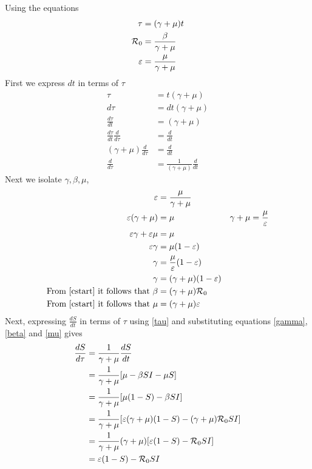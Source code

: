 Using the equations
\begin{subequations}\label{cstart}
\begin{align}
  \tau &= (\gamma+\mu)t\\
  {\mathcal R_0} &= \frac{\beta}{\gamma+\mu}\\
  \varepsilon &= \frac {\mu}{\gamma+\mu}
\end{align}
\end{subequations}
First we express $dt$ in terms of $\tau$
\begin{align}
    \tau &= t(\gamma + \mu)\nonumber\\
    d\tau &= dt(\gamma + \mu)\nonumber\\
    \frac{d\tau}{dt} &= (\gamma + \mu)\nonumber\\
    \frac{d\tau}{dt}\frac{d}{d\tau} &= \frac{d}{dt}\nonumber\\
    (\gamma+\mu)\frac{d}{d\tau} &= \frac{d}{dt}\nonumber\\
    \frac{d}{d\tau} &= \frac{1}{(\gamma+\mu)}\frac{d}{dt}\label{tau}
\end{align}
Next we isolate $\gamma,\beta,\mu$,
\begin{align}
    \varepsilon &= \frac{\mu}{\gamma+\mu}\nonumber\\
    \varepsilon(\gamma + \mu) &= \mu &\gamma+\mu = \frac{\mu}{\varepsilon} \nonumber\\
    \varepsilon \gamma + \varepsilon \mu &= \mu\nonumber\\
    \varepsilon \gamma &= \mu(1-\varepsilon)\nonumber\\
    \gamma &= \frac{\mu}{\varepsilon}(1-\varepsilon)\nonumber\\
    \gamma &= (\gamma+\mu)(1-\varepsilon)\label{gamma}\\
    \textrm{From \ref{cstart} it follows that}\ \beta &= (\gamma+\mu){\mathcal R_0}\label{beta}\\
    \textrm{From \ref{cstart} it follows that}\ \mu &= (\gamma+\mu)\varepsilon\label{mu}
\end{align}
Next, expressing $\frac{dS}{dt}$ in terms of $\tau$ using \ref{tau} and substituting equations \ref{gamma},\ref{beta} and \ref{mu} gives
\begin{align}
    \frac{dS}{d\tau} &= \frac{1}{\gamma+\mu}\frac{dS}{dt}\nonumber\\
     &= \frac{1}{\gamma+\mu}[\mu-\beta SI -\mu S]\nonumber\\
     &= \frac{1}{\gamma+\mu}[\mu(1-S)-\beta SI]\\
     &= \frac{1}{\gamma+\mu}[\varepsilon(\gamma+\mu)(1-S)- (\gamma+\mu){\mathcal R_0}SI]\nonumber\\
     &= \frac{1}{\gamma+\mu}(\gamma+\mu)[\varepsilon(1-S)- {\mathcal R_0}SI]\nonumber\\
     &= \varepsilon(1-S)- {\mathcal R_0}SI
\end{align}
